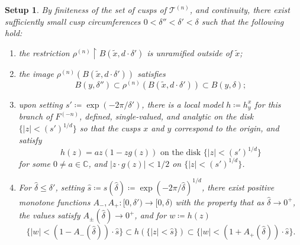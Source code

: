 \documentclass{amsart}
\newcommand\C{{\mathbb{C}}}
\newtheorem{setup}[thm]{Setup}
\theoremstyle{definition}
\theoremstyle{remark}
\newcommand{\cT}{\mathcal{T}}
\begin{document}
\begin{setup}\label{setup}
By finiteness of the set of cusps of $\cT^{(n)}$, and continuity, there exist sufficiently small cusp circumferences $0<\delta'' < \delta' < \delta$ such that the following hold:
\begin{enumerate}
\item the restriction $\rho^{(n)}\restriction B(\tilde{x}, d\cdot \delta')$ is unramified outside of $\tilde{x}$;
\item the image $\rho^{(n)}(B(\tilde{x}, d\cdot \delta'))$ satisfies 
\[ B(y, \delta'') \subset \rho^{(n)}(B(\tilde{x}, d\cdot \delta')) \subset B(y, \delta);\]
\item upon setting $s'\coloneqq\exp(-2\pi / \delta')$, there is a local model $h\coloneqq h^x_y$ for this branch of $F^{(-n)}$, defined, single-valued, and analytic on the disk $\{|z|<(s')^{1/d}\}$ so that the cusps $x$ and $y$ correspond to the origin, and satisfy
\begin{equation}\label{eqn:dwind}
h(z)=az(1-zg(z))\text{ on the disk }\{|z|< (s')^{1/d}\}
\end{equation}
for some $0 \neq a\in \C$, and $|z\cdot g(z)| < 1/2$ on $\{|z|<(s')^{1/d}\}$.
\item For $\hat{\delta}\leq \delta'$, setting $\hat{s}\coloneqq s(\hat{\delta})\coloneqq\exp(-2\pi/\hat{\delta})^{1/d}$, there exist positive monotone functions $A_-, A_+\colon [0,\delta')\to [0,\delta)$ with the property that as  $\hat{\delta}\to 0^+$, the values satisfy $A_\pm(\hat{\delta})\to 0^+$, and for $w\coloneqq h(z)$
  \[ \{|w|<(1-A_-(\hat{\delta}))\cdot \hat{s}\} \subset h(\{|z|<\hat{s}\}) \subset  \{|w|<(1+A_+(\hat{\delta}))\cdot \hat{s}\}.\]
  \label{setup:deltahat}
\end{enumerate} 
\end{setup}
\end{document}
